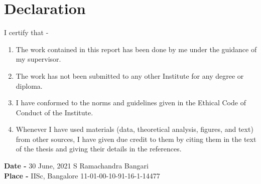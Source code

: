 \cleardoublepage
\chapter*{\centering Declaration}

I certify that - 
\begin{enumerate}[label=(\alph*)]
\item The work contained in this report has been done by me under the guidance of my supervisor.
\item The work has not been submitted to any other Institute for any degree or diploma.
\item I have conformed to the norms and guidelines given in the Ethical Code of Conduct of the Institute.
\item Whenever I have used materials (data, theoretical analysis, figures, and text) from other sources, I have given due credit to them by citing them in the text of the thesis and giving their details in the references.
\end{enumerate}
\vspace{6 cm}
\textbf{Date -} 30 June, 2021 \hfill S Ramachandra Bangari \\
\textbf{Place -} IISc, Bangalore \hfill 11-01-00-10-91-16-1-14477